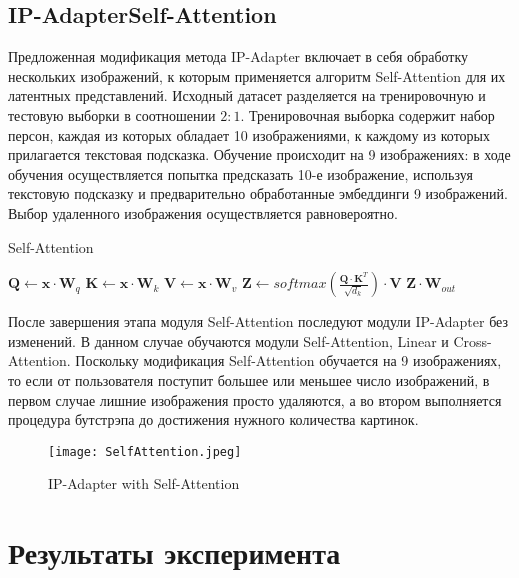 \documentclass{article}
\begin{document}
\subsection{IP-AdapterSelf-Attention}
Предложенная модификация метода IP-Adapter включает в себя обработку нескольких изображений, к которым применяется алгоритм Self-Attention\cite{4} для их латентных представлений. Исходный датасет разделяется на тренировочную и тестовую выборки в соотношении $2:1$. Тренировочная выборка содержит набор персон, каждая из которых обладает 10 изображениями, к каждому из которых прилагается текстовая подсказка. Обучение происходит на 9 изображениях: в ходе обучения осуществляется попытка предсказать 10-е изображение, используя текстовую подсказку и предварительно обработанные эмбеддинги 9 изображений. Выбор удаленного изображения осуществляется равновероятно.

\begin{algorithm}
\caption{Self-Attention}
\label{self_attention}
\begin{algorithmic}
    \State $\mathbf{Q} \gets \mathbf{x} \cdot \mathbf{W}_{q}$
    \State $\mathbf{K} \gets \mathbf{x} \cdot \mathbf{W}_{k}$
    \State $\mathbf{V} \gets \mathbf{x} \cdot \mathbf{W}_{v}$
    \State $\mathbf{Z} \gets \text{$softmax$}\left(\frac{\mathbf{Q} \cdot \mathbf{K}^T}{\sqrt{d_k}}\right) \cdot \mathbf{V}$
    \State \Return $\mathbf{Z} \cdot \mathbf{W}_{out}$
\EndProcedure
\end{algorithmic}
\end{algorithm}

После завершения этапа модуля Self-Attention последуют модули IP-Adapter без изменений. В данном случае обучаются модули Self-Attention, Linear и Cross-Attention. Поскольку модификация Self-Attention обучается на 9 изображениях, то если от пользователя поступит большее или меньшее число изображений, в первом случае лишние изображения просто удаляются, а во втором выполняется процедура бутстрэпа до достижения нужного количества картинок.


\begin{figure}[h]
    \centering
    \texttt{[image: SelfAttention.jpeg]}
    \caption{IP-Adapter with Self-Attention}
    \label{fig:self_attention}
\end{figure}


\section{Результаты эксперимента}
\end{document}
